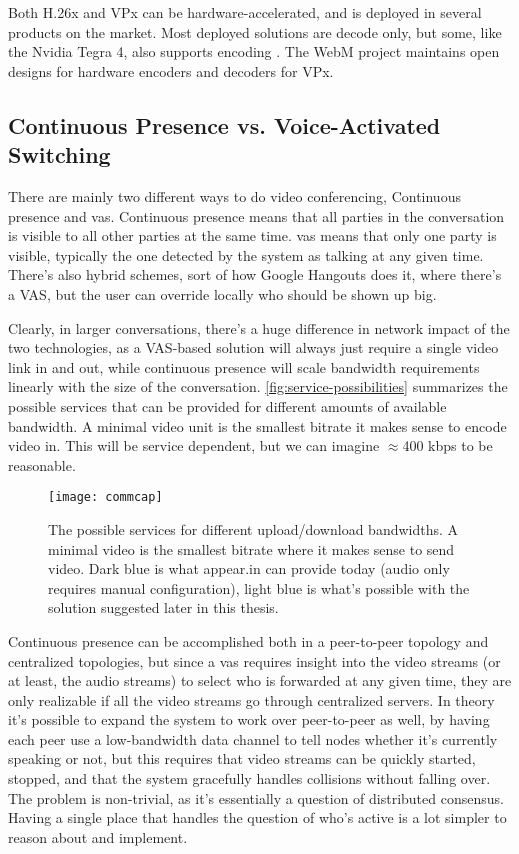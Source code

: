 Both H.26x and VPx can be hardware-accelerated, and is deployed in several products on the market. Most deployed solutions are decode only, but some, like the Nvidia Tegra 4, also supports encoding \cite{nvidia-hw-encode}. The WebM project maintains open designs for hardware encoders and decoders for VPx.


\subsection{Continuous Presence vs. Voice-Activated Switching}

There are mainly two different ways to do video conferencing, Continuous presence and \acrfull{vas}. Continuous presence means that all parties in the conversation is visible to all other parties at the same time. \gls{vas} means that only one party is visible, typically the one detected by the system as talking at any given time. There's also hybrid schemes, sort of how Google Hangouts does it, where there's a VAS, but the user can override locally who should be shown up big.

Clearly, in larger conversations, there's a huge difference in network impact of the two technologies, as a VAS-based solution will always just require a single video link in and out, while continuous presence will scale bandwidth requirements linearly with the size of the conversation. \autoref{fig:service-possibilities} summarizes the possible services that can be provided for different amounts of available bandwidth. A minimal video unit is the smallest bitrate it makes sense to encode video in. This will be service dependent, but we can imagine $\approx$400 kbps to be reasonable.

\begin{figure}
    \centering
    \texttt{[image: commcap]}
    \caption{The possible services for different upload/download bandwidths. A minimal video is the smallest bitrate where it makes sense to send video. Dark blue is what appear.in can provide today (audio only requires manual configuration), light blue is what's possible with the solution suggested later in this thesis.}
    \label{fig:service-possibilities}
\end{figure}

Continuous presence can be accomplished both in a peer-to-peer topology and centralized topologies, but since a \gls{vas} requires insight into the video streams (or at least, the audio streams) to select who is forwarded at any given time, they are only realizable if all the video streams go through centralized servers. In theory it's possible to expand the system to work over peer-to-peer as well, by having each peer use a low-bandwidth data channel to tell nodes whether it's currently speaking or not, but this requires that video streams can be quickly started, stopped, and that the system gracefully handles collisions without falling over. The problem is non-trivial, as it's essentially a question of distributed consensus. Having a single place that handles the question of who's active is a lot simpler to reason about and implement.

